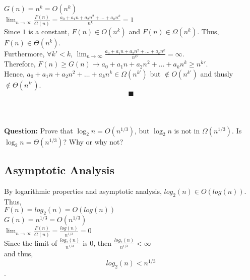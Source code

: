 \documentclass[a4paper,12pt]{article}
\begin{document}
$G(n) = n^k = O(n^k)$\\

$\lim_{n\to\infty} \frac{F(n)}{G(n)} = \frac{a_0+a_1n+a_2n^2+\ldots + a_kn^k}{n^k} = 1$\\

Since $1$ is a constant, $F(n) \in O(n^k)$ and $F(n) \in \Omega(n^k)$. Thus,  $F(n) \in \Theta(n^k)$.\\

Furthermore, $\forall k\prime < k$, $\lim_{n\to\infty}  \frac{a_0+a_1n+a_2n^2+\ldots + a_kn^k}{n^k\prime}=\infty$.\\

Therefore, $F(n) \geq G(n) \rightarrow a_0+a_1n+a_2n^2+\ldots + a_kn^k \geq n^k\prime$.\\

Hence,  $a_0+a_1n+a_2n^2+\ldots + a_kn^k \in \Omega(n^{k\prime})$ but $\notin O(n^{k\prime})$ and thusly $\notin \Theta(n^{k\prime})$.\\

$$\blacksquare$$\\

\section{}

\textbf{Question:} Prove that $\log_2n = O(n^{1/3})$, but $\log_2n$ is not in $\Omega(n^{1/3})$. Is $\log_2n = \Theta(n^{1/3})$? Why or why not?\\

\subsection{Asymptotic Analysis}

By logarithmic properties and asymptotic analysis, $log_2(n) \in O(log(n))$. Thus,\\

$F(n)= log_2(n) = O(log(n))$\\

$G(n)=n^{1/3} = O(n^{1/3})$\\

$\lim_{n\to\infty} \frac{F(n)}{G(n)} = \frac{log(n)}{n^{1/3}} = 0$\\

Since the limit of $\frac{log_2(n)}{n^{1/3}}$ is $0$, then $\frac{log_2(n)}{n^{1/3}} < \infty$\\ and thus,\\

$$log_2(n) < n^{1/3}$$.\\
\end{document}
